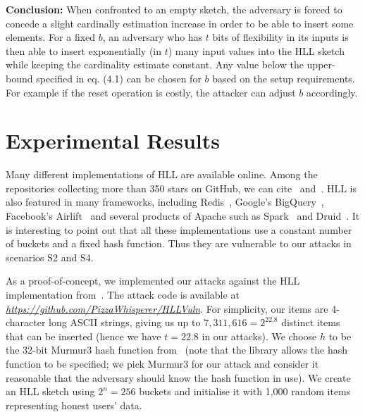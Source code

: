 \documentclass[11pt]{article}
\begin{document}
\textbf{Conclusion:} When confronted to an empty sketch, the adversary is forced to concede a slight cardinally estimation increase in order to be able to insert some elements.
For a fixed $b$, an adversary who has $t$ bits of flexibility in its inputs is then able to insert exponentially (in $t$) many input values into the HLL sketch while keeping the cardinality estimate constant.
Any value below the upper-bound specified in eq. (4.1) can be chosen for $b$ based on the setup requirements. For example if the reset operation is costly, the attacker can adjust $b$ accordingly. 


\section{Experimental Results}\label{sec:exp}
Many different implementations of HLL are available online. Among the repositories collecting more than 350 stars on GitHub, we can cite~\cite{clahll} and~\cite{datasketch}. HLL is also featured in many frameworks, including Redis~\cite{redis}, Google's BigQuery~\cite{bigquery}, Facebook's Airlift~\cite{airlift} and several products of Apache such as Spark~\cite{spahll} and Druid~\cite{druhll}. It is interesting to point out that all these implementations use a constant number of buckets and a fixed hash function. Thus they are vulnerable to our attacks in scenarios S2 and S4.

As a proof-of-concept, we implemented our attacks against the HLL implementation from~\cite{clahll}. The attack code is available at \href{https://github.com/PizzaWhisperer/HLLVuln}{\textit{\url{https://github.com/PizzaWhisperer/HLLVuln}}}. For simplicity, our items are 4-character long ASCII strings, giving us up to $7,311,616= 2^{22.8}$ distinct items that can be inserted (hence we have $t=22.8$ in our attacks). We choose $h$ to be the 32-bit Murmur3 hash function from~\cite{murmur3code} (note that the library allows the hash function to be specified; we pick Murmur3 for our attack and consider it reasonable that the adversary should know the hash function in use).
We create an HLL sketch using $2^n = 256$ buckets and initialise it with 1,000 random items representing honest users' data.
\end{document}
